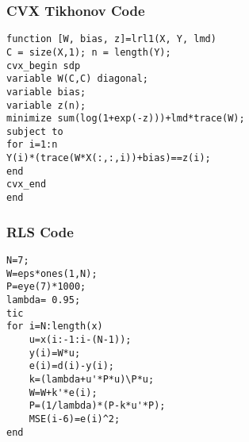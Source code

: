 \documentclass[11pt]{beamer}
\begin{document}
\begin{frame}[fragile] %
\frametitle{CVX Tikhonov Code}
\begin{verbatim}
function [W, bias, z]=lrl1(X, Y, lmd)
C = size(X,1); n = length(Y);
cvx_begin sdp
variable W(C,C) diagonal;
variable bias;
variable z(n);
minimize sum(log(1+exp(-z)))+lmd*trace(W);
subject to
for i=1:n
Y(i)*(trace(W*X(:,:,i))+bias)==z(i);
end
cvx_end
end
\end{verbatim}
\end{frame}
\begin{frame}[fragile] %
\frametitle{RLS Code}
\begin{verbatim}
N=7;
W=eps*ones(1,N);
P=eye(7)*1000;
lambda= 0.95;
tic
for i=N:length(x)
    u=x(i:-1:i-(N-1));
    y(i)=W*u;
    e(i)=d(i)-y(i);
    k=(lambda+u'*P*u)\P*u;
    W=W+k'*e(i);
    P=(1/lambda)*(P-k*u'*P);
    MSE(i-6)=e(i)^2;
end
\end{verbatim}
\end{frame}
\end{document}

